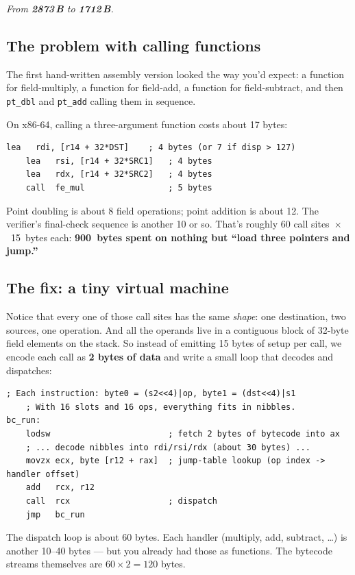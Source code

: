 \documentclass[11pt,a4paper]{article}
\newcommand{\bytes}[1]{\textcolor{blue!60!black}{\textbf{#1\,B}}}
\begin{document}
\noindent\emph{From \bytes{2873} to \bytes{1712}.}

\subsection{The problem with calling functions}

The first hand-written assembly version looked the way you'd expect:
a function for field-multiply, a function for field-add, a function
for field-subtract, and then \texttt{pt\_dbl} and \texttt{pt\_add}
calling them in sequence.

On x86-64, calling a three-argument function costs about 17 bytes:
\begin{lstlisting}[language={[x86masm]Assembler}]
    lea   rdi, [r14 + 32*DST]    ; 4 bytes (or 7 if disp > 127)
    lea   rsi, [r14 + 32*SRC1]   ; 4 bytes
    lea   rdx, [r14 + 32*SRC2]   ; 4 bytes
    call  fe_mul                 ; 5 bytes
\end{lstlisting}
Point doubling is about 8 field operations; point addition is about
12. The verifier's final-check sequence is another 10 or so. That's
roughly 60 call sites~$\times$~15~bytes each: \textbf{900~bytes spent
on nothing but ``load three pointers and jump.''}

\subsection{The fix: a tiny virtual machine}

Notice that every one of those call sites has the same \emph{shape}:
one destination, two sources, one operation. And all the operands
live in a contiguous block of 32-byte field elements on the stack.
So instead of emitting 15 bytes of setup per call, we encode each
call as \textbf{2 bytes of data} and write a small loop that decodes
and dispatches:

\begin{lstlisting}[language={[x86masm]Assembler}]
    ; Each instruction: byte0 = (s2<<4)|op, byte1 = (dst<<4)|s1
    ; With 16 slots and 16 ops, everything fits in nibbles.
bc_run:
    lodsw                        ; fetch 2 bytes of bytecode into ax
    ; ... decode nibbles into rdi/rsi/rdx (about 30 bytes) ...
    movzx ecx, byte [r12 + rax]  ; jump-table lookup (op index -> handler offset)
    add   rcx, r12
    call  rcx                    ; dispatch
    jmp   bc_run
\end{lstlisting}

The dispatch loop is about 60 bytes. Each handler (multiply, add,
subtract, \ldots) is another 10--40 bytes --- but you already had
those as functions. The bytecode streams themselves are $60 \times 2
= 120$ bytes.
\end{document}
